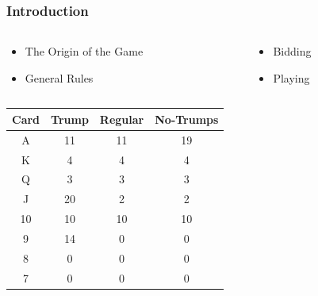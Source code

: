 \documentclass{beamer}
\begin{document}
\begin{frame}\frametitle{Introduction}
\begin{center}
    \begin{columns}
        \begin{column}{5cm}
        \begin{itemize}
        \item The Origin of the Game
        \item General Rules
        \end{itemize}
        \end{column}
        \begin{column}{2cm}
            \begin{itemize}
                \item Bidding
                \item Playing
            \end{itemize}
        \end{column}
    \end{columns}
    \vspace{15pt}
            \begin{tabular}{|c|c|c|c|}
                \hline
                \textbf{Card} & \textbf{Trump} & \textbf{Regular} & \textbf{No-Trumps}\\
                \hline
                A & 11 & 11 & 19\\
                \hline
                K & 4 & 4 & 4\\
                \hline
                Q & 3 & 3 & 3\\
                \hline
                J & 20 & 2 & 2\\
                \hline
                10 & 10 & 10 & 10\\
                \hline
                9 & 14 & 0 & 0\\
                \hline
                8 & 0 & 0 & 0\\
                \hline
                7 & 0 & 0 & 0\\
                \hline
            \end{tabular}

\end{center}
\end{frame}
\end{document}
